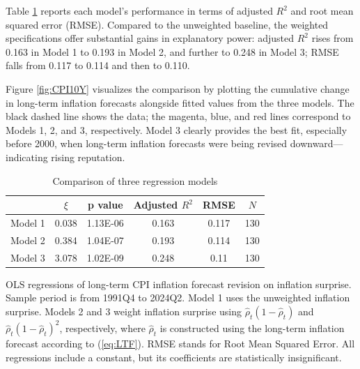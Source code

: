 \documentclass[12pt,letter,leqno]{article}
\theoremstyle{asn}
\theoremstyle{lem}
\theoremstyle{slem}
\theoremstyle{prop}
\theoremstyle{appprop}
\theoremstyle{rem}
\theoremstyle{defn}
\begin{document}
Table \ref{tab:regression} reports each model’s performance in terms of adjusted $R^2$ and root mean squared error (RMSE). Compared to the unweighted baseline, the weighted specifications offer substantial gains in explanatory power: adjusted $R^2$ rises from 0.163 in Model 1 to 0.193 in Model 2, and further to 0.248 in Model 3; RMSE falls from 0.117 to 0.114 and then to 0.110.

Figure \ref{fig:CPI10Y} visualizes the comparison by plotting the cumulative change in long-term inflation forecasts alongside fitted values from the three models. The black dashed line shows the data; the magenta, blue, and red lines correspond to Models 1, 2, and 3, respectively. Model 3 clearly provides the best fit, especially before 2000, when long-term inflation forecasts were being revised downward—indicating rising reputation.

\begin{table}[htbp]
  \centering
  \caption{Comparison of three regression models}
    \begin{tabular}{lccccc}
    \toprule
          & $\xi$ & p value & Adjusted $R^2$ & RMSE  & $N$ \\
    \midrule
    Model 1 & 0.038 & 1.13E-06 & 0.163 & 0.117 & 130 \\
    Model 2 & 0.384 & 1.04E-07 & 0.193 & 0.114 & 130 \\
    Model 3 & 3.078 & 1.02E-09 & 0.248 & 0.11  & 130 \\
    \bottomrule
    \end{tabular}%
  \label{tab:regression}%

  \begin{flushleft}
\footnotesize{OLS regressions of long-term CPI inflation forecast revision on inflation surprise. Sample period is from 1991Q4 to 2024Q2. Model 1 uses the unweighted inflation surprise. Models 2 and 3 weight inflation surprise using $\widehat{\rho}_t(1-\widehat{\rho}_t)$ and $\widehat{\rho}_t(1-\widehat{\rho}_t)^2$, respectively, where $\widehat{\rho}_t$ is constructed using the long-term inflation forecast according to (\ref{eq:LTF}). RMSE stands for Root Mean Squared Error. All regressions include a constant, but its coefficients are statistically insignificant.}
\end{flushleft}
\end{table}%
\end{document}
